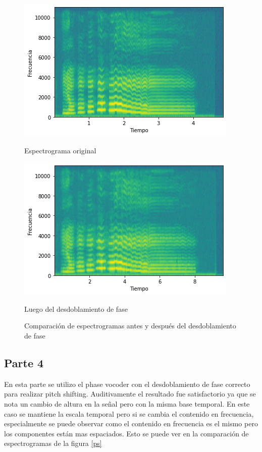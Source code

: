 \documentclass[a4paper]{article}
\begin{document}
\begin{figure}[!h]
\begin{minipage}[b]{0.5\linewidth}
\centering
\includegraphics[width=\linewidth]{original.png}
\caption{Espectrograma original}
\label{original}
\end{minipage}
\hspace{0.5cm}
\begin{minipage}[b]{0.5\linewidth}
\centering
\includegraphics[width=\linewidth]{pvbien.png}
\caption{Luego del desdoblamiento de fase}
\label{espect}
\end{minipage}
\caption{Comparación de espectrogramas antes y después del desdoblamiento de fase}
\label{pvbien}
\end{figure}

\newpage
\subsection{Parte 4}
En esta parte se utilizo el phase vocoder con el desdoblamiento de fase correcto para realizar pitch shifting. Auditivamente el resultado fue satisfactorio ya que se nota un cambio de altura en la señal pero con la misma base temporal. En este caso se mantiene la escala temporal pero si se cambia el contenido en frecuencia, especialmente se puede observar como el contenido en frecuencia es el mismo pero los componentes están mas espaciados. Esto se puede ver en la comparación de espectrogramas de la figura \ref{ps} 
\end{document}
